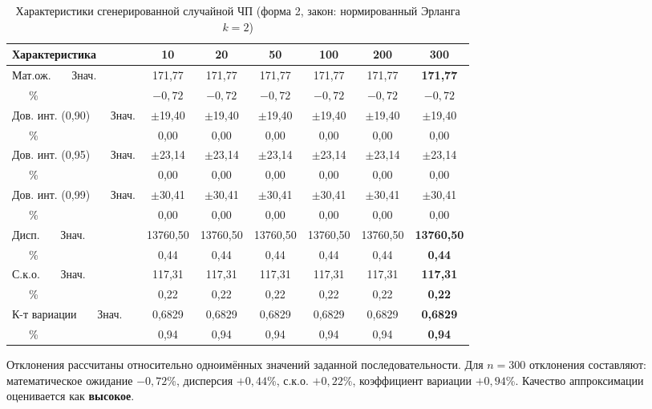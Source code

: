 \documentclass[a4paper,12pt]{article}
\begin{document}
\begin{table}[H]
\centering
\small
\caption{Характеристики сгенерированной случайной ЧП (форма 2, закон: нормированный Эрланга $k=2$)}
\label{tab:form2}
\begin{tabular}{l|cccccc}
\toprule
\textbf{Характеристика} & \textbf{10} & \textbf{20} & \textbf{50} & \textbf{100} & \textbf{200} & \textbf{300} \\
\midrule
Мат.ож. \ \ \ Знач. & 171,77 & 171,77 & 171,77 & 171,77 & 171,77 & \textbf{171,77} \\
\ \ \ \% & $-0{,}72$ & $-0{,}72$ & $-0{,}72$ & $-0{,}72$ & $-0{,}72$ & \textbf{$-0{,}72$} \\
Дов. инт. (0,90) \ \ \ Знач. & $\pm$19,40 & $\pm$19,40 & $\pm$19,40 & $\pm$19,40 & $\pm$19,40 & $\pm$19,40 \\
\ \ \ \% & 0,00 & 0,00 & 0,00 & 0,00 & 0,00 & 0,00 \\
Дов. инт. (0,95) \ \ \ Знач. & $\pm$23,14 & $\pm$23,14 & $\pm$23,14 & $\pm$23,14 & $\pm$23,14 & $\pm$23,14 \\
\ \ \ \% & 0,00 & 0,00 & 0,00 & 0,00 & 0,00 & 0,00 \\
Дов. инт. (0,99) \ \ \ Знач. & $\pm$30,41 & $\pm$30,41 & $\pm$30,41 & $\pm$30,41 & $\pm$30,41 & $\pm$30,41 \\
\ \ \ \% & 0,00 & 0,00 & 0,00 & 0,00 & 0,00 & 0,00 \\
Дисп. \ \ \ Знач. & 13760,50 & 13760,50 & 13760,50 & 13760,50 & 13760,50 & \textbf{13760,50} \\
\ \ \ \% & 0,44 & 0,44 & 0,44 & 0,44 & 0,44 & \textbf{0,44} \\
С.к.о. \ \ \ Знач. & 117,31 & 117,31 & 117,31 & 117,31 & 117,31 & \textbf{117,31} \\
\ \ \ \% & 0,22 & 0,22 & 0,22 & 0,22 & 0,22 & \textbf{0,22} \\
К-т вариации \ \ \ Знач. & 0,6829 & 0,6829 & 0,6829 & 0,6829 & 0,6829 & \textbf{0,6829} \\
\ \ \ \% & 0,94 & 0,94 & 0,94 & 0,94 & 0,94 & \textbf{0,94} \\
\bottomrule
\end{tabular}
\end{table}

Отклонения рассчитаны относительно одноимённых значений заданной последовательности. Для $n=300$ отклонения составляют: математическое ожидание $-0{,}72$\%, дисперсия $+0{,}44$\%, с.к.о. $+0{,}22$\%, коэффициент вариации $+0{,}94$\%. Качество аппроксимации оценивается как \textbf{высокое}.
\end{document}
